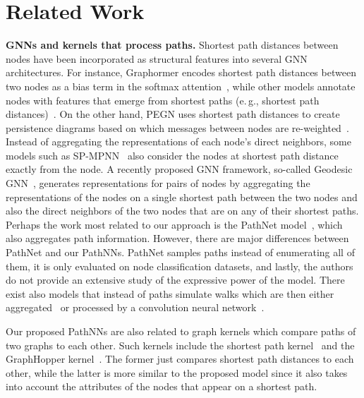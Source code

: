\documentclass{article}
\theoremstyle{plain}
\theoremstyle{definition}
\theoremstyle{remark}
\newcommand{\eg}{e.\,g., }
\begin{document}
\section{Related Work}
\textbf{GNNs and kernels that process paths.}
Shortest path distances between nodes have been incorporated as structural features into several GNN architectures.
For instance, Graphormer encodes shortest path distances between two nodes as a bias term in the softmax attention~\cite{ying2021transformers}, while other models annotate nodes with features that emerge from shortest paths (\eg shortest path distances)~\cite{li2020distance,you2019position}.
On the other hand, PEGN uses shortest path distances to create persistence diagrams based on which messages between nodes are re-weighted~\cite{zhao2020persistence}.
Instead of aggregating the representations of each node's direct neighbors, some models such as SP-MPNN~\cite{abboud2022shortest} also consider the nodes at shortest path distance exactly  from the node.
A recently proposed GNN framework, so-called Geodesic GNN~\cite{kong2022geodesic}, generates representations for pairs of nodes by aggregating the representations of the nodes on a single shortest path between the two nodes and also the direct neighbors of the two nodes that are on any of their shortest paths.
Perhaps the work most related to our approach is the PathNet model~\cite{sun2022beyond}, which also aggregates path information.
However, there are major differences between PathNet and our PathNNs.
PathNet samples paths instead of enumerating all of them, it is only evaluated on node classification datasets, and lastly, the authors do not provide an extensive study of the expressive power of the model.
There exist also models that instead of paths simulate walks which are then either aggregated~\cite{jin2022raw} or processed by a convolution neural network~\cite{toenshoff2021graph}.

Our proposed PathNNs are also related to graph kernels which compare paths of two graphs to each other.
Such kernels include the shortest path kernel~\cite{borgwardt2005shortest} and the GraphHopper kernel~\cite{feragen2013scalable}.
The former just compares shortest path distances to each other, while the latter is more similar to the proposed model since it also takes into account the attributes of the nodes that appear on a shortest path.

\begin{figure*}[t]
  \centering
  \hfil
  \hfil
  \hfil
  \caption{(a) A graph G with  vertices. (b) Shortest paths of length up to  starting from vertex , (c) all shortest paths of length up to  starting from vertex  and (d) all paths of length up to  starting from vertex .}
  \label{fig:paths}
\end{figure*}
\end{document}
